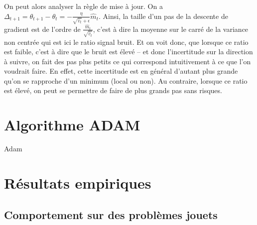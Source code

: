 \documentclass[fleqn,11pt, french, ceqn]{article}
\begin{document}
	On peut alors analyser la règle de mise à jour. On a $\Delta_{t+1} = \theta_{t+1} - \theta_{t} = - \frac{\eta}{\sqrt{\hat{v}_t} + \epsilon} \hat{m}_t$. Ainsi, la taille d'un pas de la descente de gradient est de l'ordre de $\frac{\hat{m}_t}{\sqrt{\hat{v}_t}}$, c'est à dire la moyenne sur le carré de la variance non centrée qui est ici le ratio signal bruit. Et on voit donc, que lorsque ce ratio est faible, c'est à dire que le bruit est élevé -- et donc l'incertitude sur la direction à suivre, on fait des pas plus petits ce qui correspond intuitivement à ce que l'on voudrait faire. En effet, cette incertitude est en général d'autant plus grande qu'on se rapproche d'un minimum (local ou non). Au contraire, lorsque ce ratio est élevé, on peut se permettre de faire de plus grands pas sans risques.
	
	\section{Algorithme ADAM}
	
	\begin{algorithm}[H]
		\begin{algorithmic}
			
			
				
			\ENDWHILE
		\end{algorithmic}
	\caption{ Adam}
	\end{algorithm}
	
	\section{Résultats empiriques}
	
	\subsection{Comportement sur des problèmes jouets}
	
\end{document}
